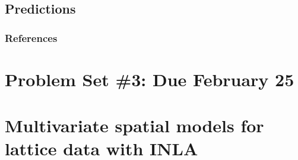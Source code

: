 \documentclass[]{book}
\begin{document}
\hypertarget{predictions}{%
\subsection{Predictions}\label{predictions}}

\hypertarget{references}{%
\subsubsection{References}\label{references}}

\hypertarget{problem-set-3-due-february-25}{%
\section{Problem Set \#3: Due February 25}\label{problem-set-3-due-february-25}}

\hypertarget{multivariate-spatial-models-for-lattice-data-with-inla}{%
\section{Multivariate spatial models for lattice data with INLA}\label{multivariate-spatial-models-for-lattice-data-with-inla}}


\end{document}
